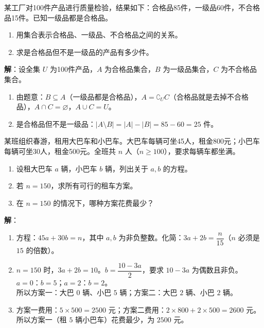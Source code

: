\documentclass[12pt, a4paper]{ctexart}
\begin{document}
\begin{appbox}[【应用2】产品检验]
某工厂对100件产品进行质量检验，结果如下：合格品85件，一级品60件，不合格品15件。已知一级品都是合格品。
\begin{enumerate}[label=(\arabic*)]
  \item 用集合表示合格品、一级品、不合格品之间的关系。
  \item 求是合格品但不是一级品的产品有多少件。
\end{enumerate}
\end{appbox}

\textbf{解}：设全集 $U$ 为100件产品，$A$ 为合格品集合，$B$ 为一级品集合，$C$ 为不合格品集合。
\begin{enumerate}[label=(\arabic*)]
  \item 由题意：$B \subseteq A$（一级品都是合格品），$A = \complement_U C$（合格品就是去掉不合格品），$A \cap C = \varnothing$，$A \cup C = U$。
  \item 是合格品但不是一级品：$|A \setminus B| = |A| - |B| = 85 - 60 = 25$ 件。
\end{enumerate}

\begin{appbox}[【应用3】不等式条件下的方案设计]
某班组织春游，租用大巴车和小巴车。大巴车每辆可坐45人，租金800元；小巴车每辆可坐30人，租金500元。全班共 $n$ 人（$n \geq 100$），要求每辆车都坐满。
\begin{enumerate}[label=(\arabic*)]
  \item 设租大巴车 $a$ 辆，小巴车 $b$ 辆，列出关于 $a, b$ 的方程。
  \item 若 $n = 150$，求所有可行的租车方案。
  \item 在 $n = 150$ 的情况下，哪种方案花费最少？
\end{enumerate}
\end{appbox}

\textbf{解}：
\begin{enumerate}[label=(\arabic*)]
  \item 方程：$45a + 30b = n$，其中 $a, b$ 为非负整数。化简：$3a + 2b = \dfrac{n}{15}$（$n$ 必须是 $15$ 的倍数）。
  \item $n = 150$ 时，$3a + 2b = 10$。$b = \dfrac{10 - 3a}{2}$，要求 $10 - 3a$ 为偶数且非负。\\
    $a = 0$：$b = 5$；$a = 2$：$b = 2$。\\
    所以方案一：大巴 $0$ 辆、小巴 $5$ 辆；方案二：大巴 $2$ 辆、小巴 $2$ 辆。
  \item 方案一费用：$5 \times 500 = 2500$ 元；方案二费用：$2 \times 800 + 2 \times 500 = 2600$ 元。\\
    所以方案一（租 $5$ 辆小巴车）花费最少，为 $\boxed{2500}$ 元。
\end{enumerate}
\end{document}
